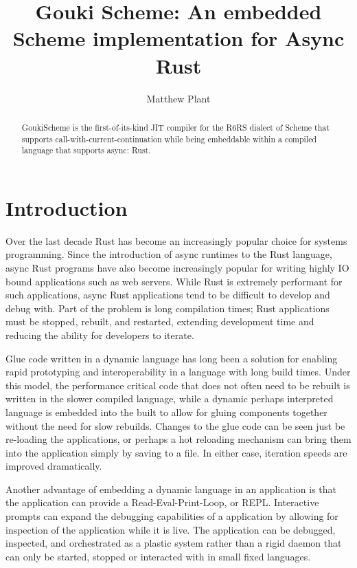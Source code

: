 \documentclass[sigplan,authordraft]{acmart}
\begin{document}
\title{Gouki Scheme: An embedded Scheme implementation for Async Rust}

\author{Matthew Plant}

\begin{abstract}

  GoukiScheme is the first-of-its-kind JIT compiler for the R6RS dialect of
  Scheme that supports call-with-current-continuation while being embeddable
  within a compiled language that supports async: Rust.

\end{abstract}

\maketitle

\section{Introduction}

Over the last decade Rust has become an increasingly popular choice for systems
programming. Since the introduction of async runtimes to the Rust language,
async Rust programs have also become increasingly popular for writing highly
IO bound applications such as web servers. While Rust is extremely performant
for such applications, async Rust applications tend to be difficult to develop
and debug with. Part of the problem is long compilation times; Rust applications
must be stopped, rebuilt, and restarted, extending development time and reducing
the ability for developers to iterate.

Glue code written in a dynamic language has long been a solution for enabling
rapid prototyping and interoperability in a language with long build times. Under
this model, the performance critical code that does not often need to be rebuilt
is written in the slower compiled language, while a dynamic perhaps interpreted
language is embedded into the built to allow for gluing components together
without the need for slow rebuilds. Changes to the glue code can be seen just be
re-loading the applications, or perhaps a hot reloading mechanism can bring them
into the application simply by saving to a file. In either case, iteration
speeds are improved dramatically.

Another advantage of embedding a dynamic language in an application is that the
application can provide a Read-Eval-Print-Loop, or REPL. Interactive prompts can
expand the debugging capabilities of a application by allowing for inspection of
the application while it is live. The application can be debugged, inspected, and
orchestrated as a plastic system rather than a rigid daemon that can only be
started, stopped or interacted with in small fixed languages.
\end{document}
